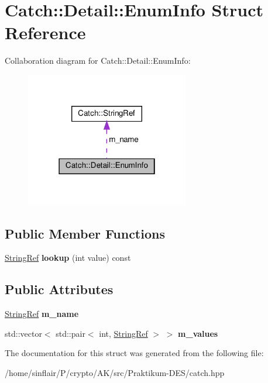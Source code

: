 \hypertarget{structCatch_1_1Detail_1_1EnumInfo}{}\section{Catch\+:\+:Detail\+:\+:Enum\+Info Struct Reference}
\label{structCatch_1_1Detail_1_1EnumInfo}


Collaboration diagram for Catch\+:\+:Detail\+:\+:Enum\+Info\+:
\nopagebreak
\begin{figure}[H]
\begin{center}
\leavevmode
\includegraphics[width=202pt]{structCatch_1_1Detail_1_1EnumInfo__coll__graph}
\end{center}
\end{figure}
\subsection*{Public Member Functions}
\begin{DoxyCompactItemize}
\item 
\mbox{\label{structCatch_1_1Detail_1_1EnumInfo_a2fdfacc411d7afb1cb690366e5e49cb3}} 
\hyperlink{classCatch_1_1StringRef}{String\+Ref} {\bfseries lookup} (int value) const
\end{DoxyCompactItemize}
\subsection*{Public Attributes}
\begin{DoxyCompactItemize}
\item 
\mbox{\label{structCatch_1_1Detail_1_1EnumInfo_a16ecfd3a7e11439433aabbdf6ecb676c}} 
\hyperlink{classCatch_1_1StringRef}{String\+Ref} {\bfseries m\+\_\+name}
\item 
\mbox{\label{structCatch_1_1Detail_1_1EnumInfo_ad65c0537a50d375859295a2c18ade489}} 
std\+::vector$<$ std\+::pair$<$ int, \hyperlink{classCatch_1_1StringRef}{String\+Ref} $>$ $>$ {\bfseries m\+\_\+values}
\end{DoxyCompactItemize}


The documentation for this struct was generated from the following file\+:\begin{DoxyCompactItemize}
\item 
/home/sinflair/\+P/crypto/\+A\+K/src/\+Praktikum-\/\+D\+E\+S/catch.\+hpp\end{DoxyCompactItemize}
